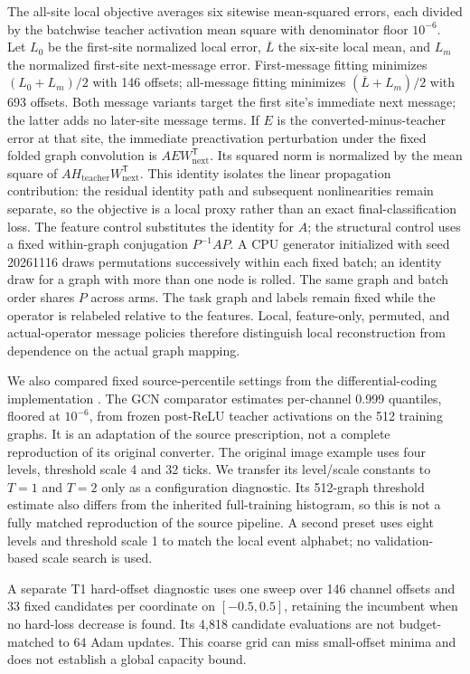 \documentclass[11pt]{article}
\begin{document}
The all-site local objective averages six sitewise mean-squared errors, each divided by the batchwise teacher activation mean square with denominator floor $10^{-6}$. Let $L_0$ be the first-site normalized local error, $\overline L$ the six-site local mean, and $L_m$ the normalized first-site next-message error. First-message fitting minimizes $(L_0+L_m)/2$ with 146 offsets; all-message fitting minimizes $(\overline L+L_m)/2$ with 693 offsets. Both message variants target the first site's immediate next message; the latter adds no later-site message terms. If $E$ is the converted-minus-teacher error at that site, the immediate preactivation perturbation under the fixed folded graph convolution is $A E W_{\mathrm{next}}^{\mathsf T}$. Its squared norm is normalized by the mean square of $A H_{\mathrm{teacher}}W_{\mathrm{next}}^{\mathsf T}$. This identity isolates the linear propagation contribution: the residual identity path and subsequent nonlinearities remain separate, so the objective is a local proxy rather than an exact final-classification loss. The feature control substitutes the identity for $A$; the structural control uses a fixed within-graph conjugation $P^{-1}AP$. A CPU generator initialized with seed 20261116 draws permutations successively within each fixed batch; an identity draw for a graph with more than one node is rolled. The same graph and batch order shares $P$ across arms. The task graph and labels remain fixed while the operator is relabeled relative to the features. Local, feature-only, permuted, and actual-operator message policies therefore distinguish local reconstruction from dependence on the actual graph mapping.

We also compared fixed source-percentile settings from the differential-coding implementation \citep{huang2025}. The GCN comparator estimates per-channel 0.999 quantiles, floored at $10^{-6}$, from frozen post-ReLU teacher activations on the 512 training graphs. It is an adaptation of the source prescription, not a complete reproduction of its original converter. The original image example uses four levels, threshold scale 4 and 32 ticks. We transfer its level/scale constants to $T=1$ and $T=2$ only as a configuration diagnostic. Its 512-graph threshold estimate also differs from the inherited full-training histogram, so this is not a fully matched reproduction of the source pipeline. A second preset uses eight levels and threshold scale 1 to match the local event alphabet; no validation-based scale search is used.

A separate T1 hard-offset diagnostic uses one sweep over 146 channel offsets and 33 fixed candidates per coordinate on $[-0.5,0.5]$, retaining the incumbent when no hard-loss decrease is found. Its 4,818 candidate evaluations are not budget-matched to 64 Adam updates. This coarse grid can miss small-offset minima and does not establish a global capacity bound.
\end{document}
